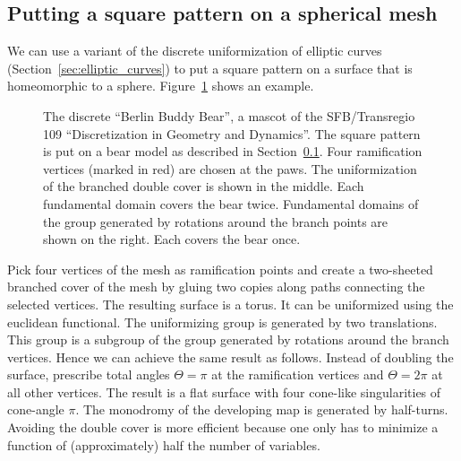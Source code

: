 \documentclass[Thesis]{subfiles}
\begin{document}
\subsection{Putting a square pattern on a spherical mesh}
\label{sec:square_pattern}

We can use a variant of the discrete uniformization of elliptic curves
(Section~\ref{sec:elliptic_curves}) to put a square pattern on a
surface that is homeomorphic to a sphere.  Figure~\ref{fig:bear} shows
an example.
\begin{figure}
\centering
{}
  \caption{The discrete ``Berlin Buddy Bear'', a mascot of the
    SFB/Transregio 109 ``Discretization in Geometry and Dynamics''. 
    The square pattern is put on a bear model as described in
    Section~\ref{sec:square_pattern}. Four ramification vertices (marked
    in red) are chosen at the paws. The uniformization of the branched
    double cover is shown in the middle. Each fundamental domain
    covers the bear twice. Fundamental domains of the
    group generated by rotations around the branch points are shown on
    the right. Each covers the bear once.
  }
  \label{fig:bear}
\end{figure}

Pick four vertices of the mesh as ramification points and create a
two-sheeted branched cover of the mesh by gluing two copies along
paths connecting the selected vertices. The resulting surface is a
torus. It can be uniformized using the euclidean functional. The
uniformizing group is generated by two translations.  This group is a
subgroup of the group generated by rotations around the branch
vertices.  Hence we can achieve the same result as follows. Instead of
doubling the surface, prescribe total angles $\Theta=\pi$ at the
ramification vertices and $\Theta=2\pi$ at all other vertices. The
result is a flat surface with four cone-like singularities of
cone-angle $\pi$. The monodromy of the developing map is generated by
half-turns. Avoiding the double cover is more efficient because one
only has to minimize a function of (approximately) half the number of
variables.
\end{document}
